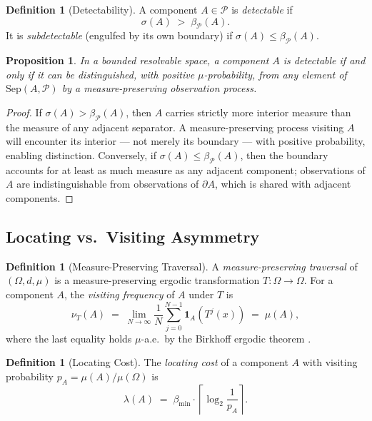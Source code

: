 \documentclass[12pt,a4paper,twocolumn]{article}
\theoremstyle{plain}
\newtheorem{proposition}[theorem]{Proposition}
\theoremstyle{definition}
\newtheorem{definition}[theorem]{Definition}
\theoremstyle{remark}
\newcommand{\Part}{\mathcal{P}}
\newcommand{\Sep}{\mathrm{Sep}}
\newcommand{\bmin}{\beta_{\min}}
\newcommand{\bP}{\beta_{\mathcal{P}}}
\newcommand{\BRS}{(\Omega,d,\mu)}
\begin{document}
\begin{definition}[Detectability]
\label{def:detectability}
A component $A \in \Part$ is \emph{detectable} if
\begin{equation}
  \sigma(A) \;>\; \bP(A).
\end{equation}
It is \emph{subdetectable} (engulfed by its own boundary) if
$\sigma(A) \leq \bP(A)$.
\end{definition}

\begin{proposition}
In a bounded resolvable space, a component $A$ is detectable if and only if
it can be distinguished, with positive $\mu$-probability, from any element
of $\Sep(A,\Part)$ by a measure-preserving observation process.
\end{proposition}

\begin{proof}
If $\sigma(A) > \bP(A)$, then $A$ carries strictly more interior measure
than the measure of any adjacent separator.  A measure-preserving process
visiting $A$ will encounter its interior --- not merely its boundary --- with
positive probability, enabling distinction.  Conversely, if $\sigma(A) \leq
\bP(A)$, then the boundary accounts for at least as much measure as any
adjacent component; observations of $A$ are indistinguishable from
observations of $\partial A$, which is shared with adjacent components.
\end{proof}

\subsection{Locating vs.\ Visiting Asymmetry}

\begin{definition}[Measure-Preserving Traversal]
\label{def:traversal}
A \emph{measure-preserving traversal} of $\BRS$ is a measure-preserving
ergodic transformation $T : \Omega \to \Omega$.  For a component $A$,
the \emph{visiting frequency} of $A$ under $T$ is
\begin{equation}
  \nu_T(A) \;=\; \lim_{N\to\infty} \frac{1}{N} \sum_{j=0}^{N-1}
    \mathbf{1}_A\!\left(T^j(x)\right) \;=\; \mu(A),
\end{equation}
where the last equality holds $\mu$-a.e.\ by the Birkhoff ergodic theorem
\citep{halmos1950measure}.
\end{definition}

\begin{definition}[Locating Cost]
\label{def:locating-cost}
The \emph{locating cost} of a component $A$ with visiting probability
$p_A = \mu(A)/\mu(\Omega)$ is
\begin{equation}
  \lambda(A) \;=\; \bmin \cdot \left\lceil \log_2 \frac{1}{p_A} \right\rceil.
\end{equation}
\end{definition}
\end{document}
